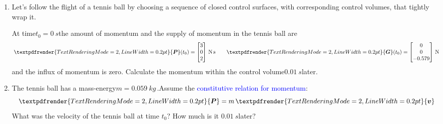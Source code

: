 \documentclass[a4paper,12pt,%
onecolumn,oneside,%
british%
]{memoir}
\renewcommand*{\bm}[1]{\textpdfrender{TextRenderingMode=2,LineWidth=0.2pt}{\boldsymbol{#1}}}
\renewcommand*{\|}[1][]{\nonscript\:#1\vert\nonscript\:\mathopen{}}
\newcommand*{\sect}{\S}%
\renewcommand*{\autoref}[2]{\sidepar{\vspace{-1ex}\footnotesize{\color{blue}\faIcon{%
angle-right%
}\enskip\sect~\ref{#1} page~\pageref{#1}}}\textcolor{blue}{#2}}
\newcommand*{\masse}{mass-energy}
\newcommand*{\yv}{\bm{v}}
\newcommand*{\yti}{t_{0}}
\newcommand*{\ym}{m}%
\newcommand*{\yP}{\bm{P}}
\newcommand*{\yG}{\bm{G}}
\begin{document}
\begin{exercise}[label={ex:tennisball}]
  \begin{enumerate}[exerc]
  \item Let's follow the flight of a tennis ball by choosing a sequence of closed control surfaces, with corresponding control volumes, that tightly wrap it.

    At time\enskip$\yti=\qty{0}{s}$\enskip the amount of momentum and the supply of momentum in the tennis ball are
    \begin{equation*}
      \yP(\yti) =
      \begin{bmatrix}
        3\\0\\2
      \end{bmatrix}\,\unit{N\,s}
      \qquad
      \yG(\yti) =
      \begin{bmatrix}
        0\\0\\-0.579
      \end{bmatrix}\,\unit{N}
    \end{equation*}
    and the influx of momentum is zero. Calculate the momentum within the control volume\enskip$\qty{0.01}{s}$\enskip later.

  \item The tennis ball has a \masse\enskip$\ym = \qty{0.059}{kg}$\,.\enskip Assume the \autoref{item:momentum_mass_velocity}{constitutive relation for momentum}:
    \begin{equation*}
      \yP = \ym\,\yv
    \end{equation*}
    What was the velocity of the tennis ball at time $\yti$? How much is it \enskip$\qty{0.01}{s}$\enskip later?
  \end{enumerate}
\end{exercise}
%
\end{document}
